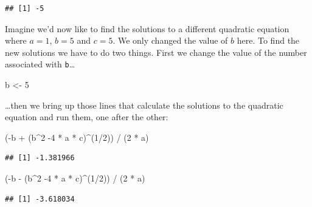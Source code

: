 \documentclass[
]{book}
\newenvironment{Shaded}{\begin{snugshade}}{\end{snugshade}}
\newcommand{\DecValTok}[1]{\textcolor[rgb]{0.00,0.00,0.81}{#1}}
\newcommand{\NormalTok}[1]{#1}
\newcommand{\OtherTok}[1]{\textcolor[rgb]{0.56,0.35,0.01}{#1}}
\newcommand{\SpecialCharTok}[1]{\textcolor[rgb]{0.00,0.00,0.00}{#1}}
\begin{document}
\begin{verbatim}
## [1] -5
\end{verbatim}

Imagine we'd now like to find the solutions to a different quadratic equation where \(a=1\), \(b=5\) and \(c=5\). We only changed the value of \(b\) here. To find the new solutions we have to do two things. First we change the value of the number associated with \texttt{b}\ldots{}

\begin{Shaded}
\begin{Highlighting}[]
\NormalTok{b }\OtherTok{\textless{}{-}} \DecValTok{5}
\end{Highlighting}
\end{Shaded}

\ldots then we bring up those lines that calculate the solutions to the quadratic equation and run them, one after the other:

\begin{Shaded}
\begin{Highlighting}[]
\NormalTok{(}\SpecialCharTok{{-}}\NormalTok{b }\SpecialCharTok{+}\NormalTok{ (b}\SpecialCharTok{\^{}}\DecValTok{2} \SpecialCharTok{{-}}\DecValTok{4} \SpecialCharTok{*}\NormalTok{ a }\SpecialCharTok{*}\NormalTok{ c)}\SpecialCharTok{\^{}}\NormalTok{(}\DecValTok{1}\SpecialCharTok{/}\DecValTok{2}\NormalTok{)) }\SpecialCharTok{/}\NormalTok{ (}\DecValTok{2} \SpecialCharTok{*}\NormalTok{ a)}
\end{Highlighting}
\end{Shaded}

\begin{verbatim}
## [1] -1.381966
\end{verbatim}

\begin{Shaded}
\begin{Highlighting}[]
\NormalTok{(}\SpecialCharTok{{-}}\NormalTok{b }\SpecialCharTok{{-}}\NormalTok{ (b}\SpecialCharTok{\^{}}\DecValTok{2} \SpecialCharTok{{-}}\DecValTok{4} \SpecialCharTok{*}\NormalTok{ a }\SpecialCharTok{*}\NormalTok{ c)}\SpecialCharTok{\^{}}\NormalTok{(}\DecValTok{1}\SpecialCharTok{/}\DecValTok{2}\NormalTok{)) }\SpecialCharTok{/}\NormalTok{ (}\DecValTok{2} \SpecialCharTok{*}\NormalTok{ a)}
\end{Highlighting}
\end{Shaded}

\begin{verbatim}
## [1] -3.618034
\end{verbatim}
\end{document}

